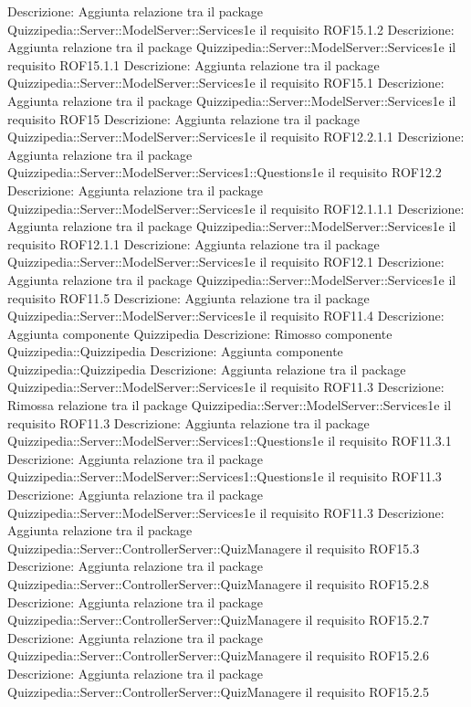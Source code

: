 Descrizione: Aggiunta relazione tra il package Quizzipedia::Server::ModelServer::Services1e il requisito ROF15.1.2 
Descrizione: Aggiunta relazione tra il package Quizzipedia::Server::ModelServer::Services1e il requisito ROF15.1.1 
Descrizione: Aggiunta relazione tra il package Quizzipedia::Server::ModelServer::Services1e il requisito ROF15.1 
Descrizione: Aggiunta relazione tra il package Quizzipedia::Server::ModelServer::Services1e il requisito ROF15 
Descrizione: Aggiunta relazione tra il package Quizzipedia::Server::ModelServer::Services1e il requisito ROF12.2.1.1 
Descrizione: Aggiunta relazione tra il package Quizzipedia::Server::ModelServer::Services1::Questions1e il requisito ROF12.2 
Descrizione: Aggiunta relazione tra il package Quizzipedia::Server::ModelServer::Services1e il requisito ROF12.1.1.1 
Descrizione: Aggiunta relazione tra il package Quizzipedia::Server::ModelServer::Services1e il requisito ROF12.1.1 
Descrizione: Aggiunta relazione tra il package Quizzipedia::Server::ModelServer::Services1e il requisito ROF12.1 
Descrizione: Aggiunta relazione tra il package Quizzipedia::Server::ModelServer::Services1e il requisito ROF11.5 
Descrizione: Aggiunta relazione tra il package Quizzipedia::Server::ModelServer::Services1e il requisito ROF11.4 
Descrizione: Aggiunta componente Quizzipedia 
Descrizione: Rimosso componente Quizzipedia::Quizzipedia 
Descrizione: Aggiunta componente Quizzipedia::Quizzipedia 
Descrizione: Aggiunta relazione tra il package Quizzipedia::Server::ModelServer::Services1e il requisito ROF11.3 
Descrizione: Rimossa relazione tra il package Quizzipedia::Server::ModelServer::Services1e il requisito ROF11.3 
Descrizione: Aggiunta relazione tra il package Quizzipedia::Server::ModelServer::Services1::Questions1e il requisito ROF11.3.1 
Descrizione: Aggiunta relazione tra il package Quizzipedia::Server::ModelServer::Services1::Questions1e il requisito ROF11.3 
Descrizione: Aggiunta relazione tra il package Quizzipedia::Server::ModelServer::Services1e il requisito ROF11.3 
Descrizione: Aggiunta relazione tra il package Quizzipedia::Server::ControllerServer::QuizManagere il requisito ROF15.3 
Descrizione: Aggiunta relazione tra il package Quizzipedia::Server::ControllerServer::QuizManagere il requisito ROF15.2.8 
Descrizione: Aggiunta relazione tra il package Quizzipedia::Server::ControllerServer::QuizManagere il requisito ROF15.2.7 
Descrizione: Aggiunta relazione tra il package Quizzipedia::Server::ControllerServer::QuizManagere il requisito ROF15.2.6 
Descrizione: Aggiunta relazione tra il package Quizzipedia::Server::ControllerServer::QuizManagere il requisito ROF15.2.5 
